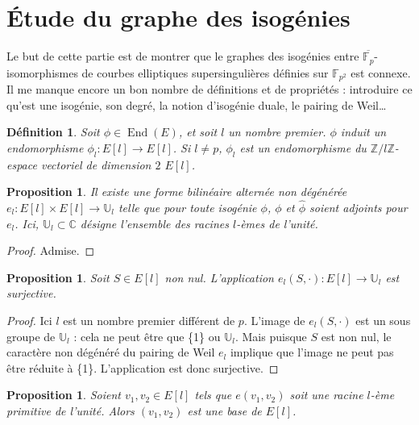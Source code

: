 \documentclass{article}
\theoremstyle{plain}%
\newtheorem{prop}[thm]{Proposition}
\newtheorem{deff}[thm]{Définition}
\theoremstyle{definition}%
\newcommand{\F}{\mathbb{F}}
\newcommand{\Z}{\mathbb{Z}}
\newcommand{\U}{\mathbb{U}}
\newcommand{\h}{\widehat}
\DeclareMathOperator{\End}{End}
\begin{document}
\section{Étude du graphe des isogénies}
Le but de cette partie est de montrer que le graphes des isogénies entre $\overline{\F_p}$-isomorphismes de courbes elliptiques supersingulières définies sur $\F_{p^2}$ est connexe. Il me manque encore un bon nombre de définitions et de propriétés : introduire ce qu'est une isogénie, son degré, la notion d'isogénie duale, le pairing de Weil\ldots

\begin{deff}
  Soit $\phi\in \End(E)$, et soit $l$ un nombre premier. $\phi$ induit un endomorphisme $\phi_l : E[l] \to E[l]$. Si $l\neq p$, $\phi_l$ est un endomorphisme du $\Z/l\Z$-espace vectoriel de dimension $2$ $E[l]$. 
\end{deff}

\begin{prop}
  \label{pairing}
  Il existe une forme bilinéaire alternée non dégénérée 
  $e_l : E[l] \times E[l] \to \mathbb{U}_l$ telle que pour toute isogénie $\phi$, $\phi$ et $\h\phi$ soient adjoints pour $e_l$.
  Ici, $\mathbb{U}_l \subset \mathbb{C}$ 
  désigne l'ensemble des racines $l$-èmes de l'unité.
\end{prop}

\begin{proof}
  Admise.
\end{proof}

\begin{prop}
  \label{surj_el}
  Soit $S\in E[l]$ non nul. L'application $e_l(S,\cdot):E[l] \to \mathbb{U}_l$ est surjective.
\end{prop}

\begin{proof}
  Ici $l$ est un nombre premier différent de $p$. L'image de  $e_l(S,\cdot)$ est un sous groupe de $\mathbb{U}_l$ : cela ne peut être que \{1\} ou $\U_l$. Mais puisque $S$ est non nul, le caractère non dégénéré du pairing de Weil $e_l$ implique que l'image ne peut pas être réduite à \{1\}. L'application est donc surjective.
\end{proof}

\begin{prop}
  \label{pairing_base}
  Soient $v_1, v_2\in E[l]$ tels que $e(v_1, v_2)$ soit une racine $l$-ème primitive de l'unité. Alors $(v_1, v_2)$ est une base de $E[l]$. 
\end{prop}
\end{document}
